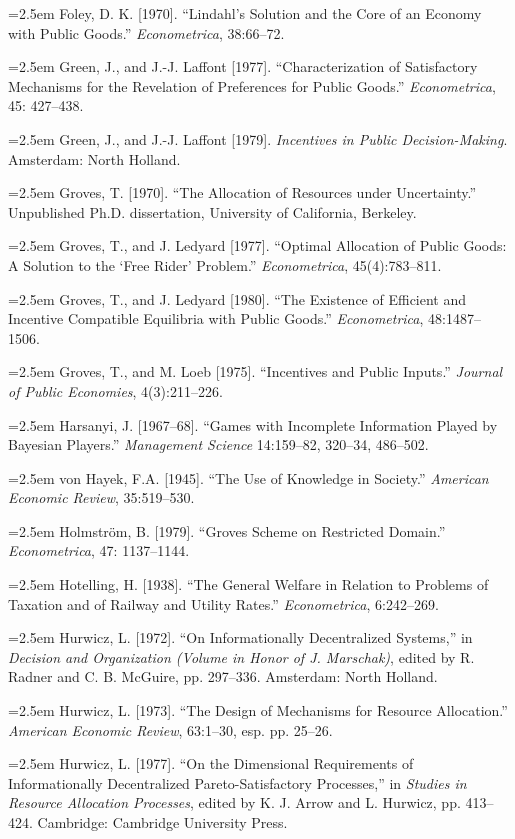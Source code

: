 \documentclass[12pt, letterpaper]{article}
\newcommand{\bibentry}[1]{\noindent\hangindent=2.5em\hangafter=1 \small #1 \par\vspace{0.75em}}
\begin{document}
\bibentry{Foley, D. K. [1970]. ``Lindahl's Solution and the Core of an Economy with Public Goods.'' \textit{Econometrica}, 38:66--72.}

\bibentry{Green, J., and J.-J. Laffont [1977]. ``Characterization of Satisfactory Mechanisms for the Revelation of Preferences for Public Goods.'' \textit{Econometrica}, 45: 427--438.}

\bibentry{Green, J., and J.-J. Laffont [1979]. \textit{Incentives in Public Decision-Making}. Amsterdam: North Holland.}

\bibentry{Groves, T. [1970]. ``The Allocation of Resources under Uncertainty.'' Unpublished Ph.D. dissertation, University of California, Berkeley.}

\bibentry{Groves, T., and J. Ledyard [1977]. ``Optimal Allocation of Public Goods: A Solution to the `Free Rider' Problem.'' \textit{Econometrica}, 45(4):783--811.}

\bibentry{Groves, T., and J. Ledyard [1980]. ``The Existence of Efficient and Incentive Compatible Equilibria with Public Goods.'' \textit{Econometrica}, 48:1487--1506.}

\bibentry{Groves, T., and M. Loeb [1975]. ``Incentives and Public Inputs.'' \textit{Journal of Public Economies}, 4(3):211--226.}

\bibentry{Harsanyi, J. [1967--68]. ``Games with Incomplete Information Played by Bayesian Players.'' \textit{Management Science} 14:159--82, 320--34, 486--502.}

\bibentry{von Hayek, F.A. [1945]. ``The Use of Knowledge in Society.'' \textit{American Economic Review}, 35:519--530.}

\bibentry{Holmström, B. [1979]. ``Groves Scheme on Restricted Domain.'' \textit{Econometrica}, 47: 1137--1144.}


\bibentry{Hotelling, H. [1938]. ``The General Welfare in Relation to Problems of Taxation and of Railway and Utility Rates.'' \textit{Econometrica}, 6:242--269.}

\bibentry{Hurwicz, L. [1972]. ``On Informationally Decentralized Systems,'' in \textit{Decision and Organization (Volume in Honor of J. Marschak)}, edited by R. Radner and C. B. McGuire, pp. 297--336. Amsterdam: North Holland.}

\bibentry{Hurwicz, L. [1973]. ``The Design of Mechanisms for Resource Allocation.'' \textit{American Economic Review}, 63:1--30, esp. pp. 25--26.}

\bibentry{Hurwicz, L. [1977]. ``On the Dimensional Requirements of Informationally Decentralized Pareto-Satisfactory Processes,'' in \textit{Studies in Resource Allocation Processes}, edited by K. J. Arrow and L. Hurwicz, pp. 413--424. Cambridge: Cambridge University Press.}
\end{document}
